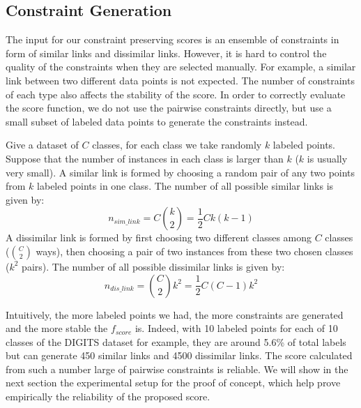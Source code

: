 \subsection{Constraint Generation}\label{sec:xp:constraint}

The input for our constraint preserving scores is an ensemble of constraints in form of similar links and dissimilar links.
However, it is hard to control the quality of the constraints when they are selected manually.
For example, a similar link between two different data points is not expected.
The number of constraints of each type also affects the stability of the score.
In order to correctly evaluate the score function, we do not use the pairwise constraints directly, but use a small subset of labeled data points to generate the constraints instead.

Give a dataset of $C$ classes, for each class we take randomly $k$ labeled points.
Suppose that the number of instances in each class is larger than $k$ ($k$ is usually very small).
A similar link is formed by choosing a random pair of any two points from $k$ labeled points in one class.
The number of all possible similar links is given by:
\begin{equation}\label{equ:n-sim-link}
n_{sim\_link} = C {k \choose 2} = \frac{1}{2} C k (k-1)
\end{equation}
A dissimilar link is formed by first choosing two different classes among $C$ classes (${C \choose 2}$ ways),
then choosing a pair of two instances from these two chosen classes ($k^2$ pairs).
The number of all possible dissimilar links is given by:
\begin{equation}\label{equ:n-dis-link}
n_{dis\_link} = {C \choose 2} k^2 = \frac{1}{2} C (C-1) k^2
\end{equation}

Intuitively, the more labeled points we had, the more constraints are generated and the more stable the $f_{score}$ is.
Indeed, with 10 labeled points for each of 10 classes of the DIGITS dataset for example, they are around 5.6\% of total labels but can generate 450 similar links and 4500 dissimilar links.
The score calculated from such a number large of pairwise constraints is reliable.
We will show in the next section the experimental setup for the proof of concept,
which help prove empirically the reliability of the proposed score.

